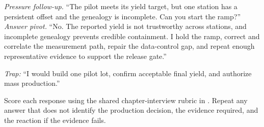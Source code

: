 \textit{Pressure follow-up.} ``The pilot meets its yield target, but one station
has a persistent offset and the genealogy is incomplete. Can you start the
ramp?''\\
\textit{Answer pivot.} ``No. The reported yield is not trustworthy across
stations, and incomplete genealogy prevents credible containment. I hold the
ramp, correct and correlate the measurement path, repair the data-control gap,
and repeat enough representative evidence to support the release gate.''

\textit{Trap:} ``I would build one pilot lot, confirm acceptable final yield,
and authorize mass production.''

Score each response using the shared chapter-interview rubric in
. Repeat any answer that does not identify
the production decision, the evidence required, and the reaction if the evidence
fails.
